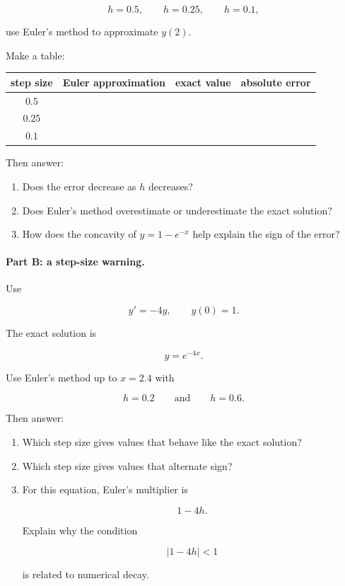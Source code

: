\[
h=0.5,\qquad h=0.25,\qquad h=0.1,
\]

use Euler's method to approximate \(y(2)\).

Make a table:

\begin{center}
\begin{tabular}{c|c|c|c}
\textbf{step size} & \textbf{Euler approximation} & \textbf{exact value} & \textbf{absolute error} \\ \hline
\(0.5\) & & & \\
\(0.25\) & & & \\
\(0.1\) & & &
\end{tabular}
\end{center}

Then answer:

\begin{enumerate}
\item Does the error decrease as \(h\) decreases?

\item Does Euler's method overestimate or underestimate the exact solution?

\item How does the concavity of \(y=1-e^{-x}\) help explain the sign of the error?
\end{enumerate}

\paragraph{Part B: a step-size warning.}
Use

\[
y'=-4y,
\qquad
y(0)=1.
\]

The exact solution is

\[
y=e^{-4x}.
\]

Use Euler's method up to \(x=2.4\) with

\[
h=0.2
\qquad\text{and}\qquad
h=0.6.
\]

Then answer:

\begin{enumerate}
\item Which step size gives values that behave like the exact solution?

\item Which step size gives values that alternate sign?

\item For this equation, Euler's multiplier is

\[
1-4h.
\]

Explain why the condition

\[
|1-4h|<1
\]

is related to numerical decay.
\end{enumerate}

